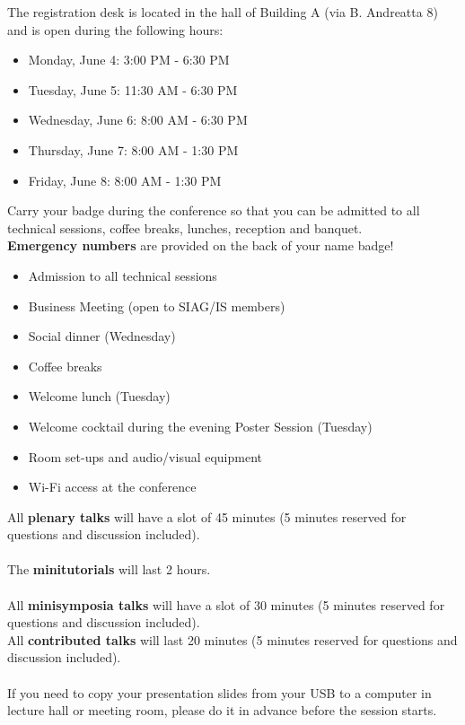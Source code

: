 \newpage

The registration desk is located in the hall of Building A (via B. Andreatta 8) and is open during the following hours:

\bigskip

\begin{itemize}
  \item[] Monday, June 4: 3:00 PM - 6:30 PM
  \item[] Tuesday, June 5: 11:30 AM - 6:30 PM
  \item[] Wednesday, June 6: 8:00 AM - 6:30 PM
  \item[] Thursday, June 7: 8:00 AM - 1:30 PM
  \item[] Friday, June 8: 8:00 AM - 1:30 PM
\end{itemize}

Carry your badge during the conference so that you can be admitted to all technical sessions, coffee breaks, lunches, reception and banquet.\\
\textbf{Emergency numbers} are provided on the back of your name badge! 


\bigskip

\begin{itemize}
  \item[] Admission to all technical sessions
  \item[] Business Meeting (open to SIAG/IS members)
  \item[] Social dinner (Wednesday)
  \item[] Coffee breaks 
  \item[] Welcome lunch (Tuesday)
  \item[] Welcome cocktail during the evening Poster Session (Tuesday)
  \item[] Room set-ups and audio/visual equipment
  \item[] Wi-Fi access at the conference
\end{itemize}%



\noindent All \textbf{plenary talks} will have a slot of 45 minutes
(5 minutes reserved for questions and discussion included).\\\\
The \textbf{minitutorials} will last 2 hours.\\\\
All \textbf{minisymposia talks} will have a slot of 30 minutes (5 minutes reserved for questions and discussion included).\\
All \textbf{contributed talks} will last 20 minutes (5 minutes reserved for questions and discussion included).\\\\
If you need to copy your presentation slides from your USB to a computer in lecture hall or meeting room, please do it in advance before
the session starts.

